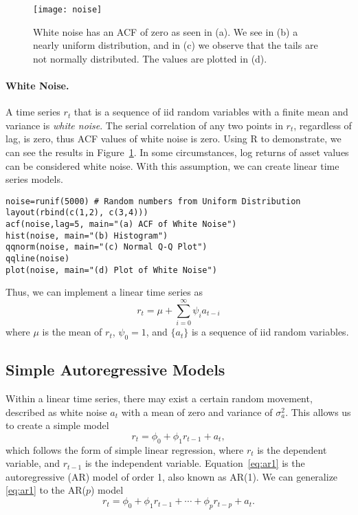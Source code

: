 \pagebreak
\begin{figure}[tb]
  \centering
  \texttt{[image: noise]}
  \caption[Properties of White Noise]{White noise has an ACF of zero as seen in (a). We see in (b) a nearly uniform distribution, and in (c) we observe that the tails are not normally distributed. The values are plotted in (d).}
  \label{figure:noise}
\end{figure}

\paragraph{White Noise.} A time series $r_t$ that is a sequence of iid random variables with a finite mean and variance is \emph{white noise}. The serial correlation of any two points in $r_t$, regardless of lag, is zero, thus ACF values of white noise is zero. Using R to demonstrate, we can see the results in Figure~\ref{figure:noise}. In some circumstances, log returns of asset values can be considered white noise. With this assumption, we can create linear time series models.
\begin{verbatim}
noise=runif(5000) # Random numbers from Uniform Distribution
layout(rbind(c(1,2), c(3,4)))
acf(noise,lag=5, main="(a) ACF of White Noise")
hist(noise, main="(b) Histogram")
qqnorm(noise, main="(c) Normal Q-Q Plot")
qqline(noise)
plot(noise, main="(d) Plot of White Noise")
\end{verbatim}

Thus, we can implement a linear time series as
\begin{equation}
r_t = \mu + \sum^{\infty}_{i=0} \psi_i a_{t-i}
\end{equation}
where $\mu$ is the mean of $r_t$, $\psi_0=1$, and $\{a_t\}$ is a sequence of iid random variables.

\subsection{Simple Autoregressive Models}
Within a linear time series, there may exist a certain random movement, described as white noise $a_t$ with a mean of zero and variance of $\sigma^2_a$. This allows us to create a simple model
\begin{equation}
r_t = \phi_0 +\phi_1 r_{t-1} + a_t,
\label{eq:ar1}
\end{equation}
which follows the form of simple linear regression, where $r_t$ is the dependent variable, and $r_{t-1}$ is the independent variable. Equation~\eqref{eq:ar1} is the autoregressive (AR) model of order 1, also known as AR(1). We can generalize \eqref{eq:ar1} to the AR($p$) model
\begin{equation}
r_t = \phi_0 +\phi_1 r_{t-1} + \cdots + \phi_p r_{t-p} + a_t.
\label{eq:arp}
\end{equation}

